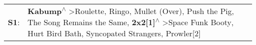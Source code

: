 \begin{supertabular}{p{0.03\textwidth}p{0.92\textwidth}}
 \textbf{S1}:  &  \textbf{Kabump\textsuperscript{$\wedge$}} \textgreater \enspace Roulette\textsuperscript{}, \enspace Ringo\textsuperscript{}, \enspace Mullet (Over)\textsuperscript{}, \enspace Push the Pig\textsuperscript{}, \enspace The Song Remains the Same\textsuperscript{}, \enspace \textbf{2x2[1]\textsuperscript{$\wedge$}} \textgreater \enspace Space Funk Booty\textsuperscript{}, \enspace Hurt Bird Bath\textsuperscript{}, \enspace Syncopated Strangers\textsuperscript{}, \enspace Prowler[2]\textsuperscript{}  \enspace  \\
\end{supertabular}
